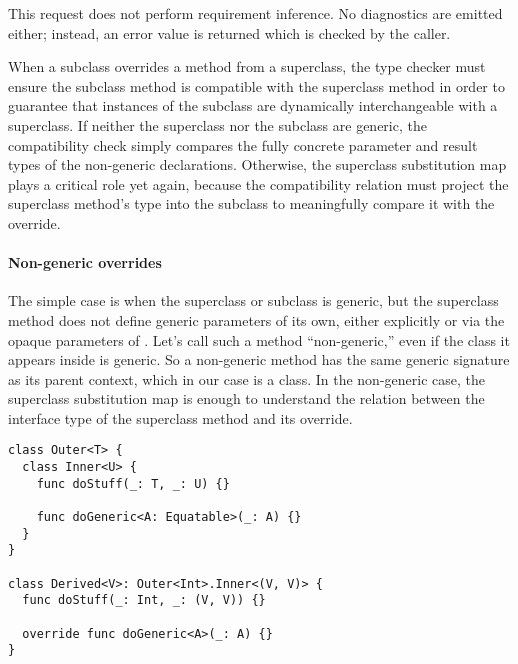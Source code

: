 \documentclass[../generics]{subfiles}
\begin{document}
This request does not perform requirement inference. No diagnostics are emitted either; instead, an error value is returned which is checked by the caller.

\iffalse

When a subclass overrides a method from a superclass, the type checker must ensure the subclass method is compatible with the superclass method in order to guarantee that instances of the subclass are dynamically interchangeable with a superclass. If neither the superclass nor the subclass are generic, the compatibility check simply compares the fully concrete parameter and result types of the non-generic declarations. Otherwise, the superclass substitution map plays a critical role yet again, because the compatibility relation must project the superclass method's type into the subclass to meaningfully compare it with the override.

\paragraph{Non-generic overrides}
The simple case is when the superclass or subclass is generic, but the superclass method does not define generic parameters of its own, either explicitly or via the opaque parameters of . Let's call such a method ``non-generic,'' even if the class it appears inside is generic. So a non-generic method has the same generic signature as its parent context, which in our case is a class. In the non-generic case, the superclass substitution map is enough to understand the relation between the interface type of the superclass method and its override.

\begin{listing}\label{method overrides}
\begin{Verbatim}
class Outer<T> {
  class Inner<U> {
    func doStuff(_: T, _: U) {}

    func doGeneric<A: Equatable>(_: A) {}
  }
}

class Derived<V>: Outer<Int>.Inner<(V, V)> {
  func doStuff(_: Int, _: (V, V)) {}

  override func doGeneric<A>(_: A) {}
}
\end{Verbatim}
\end{listing}
\end{document}
